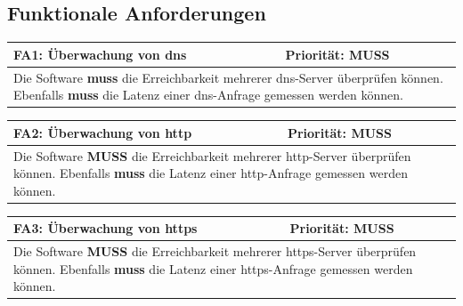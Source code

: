 \documentclass[titlepage]{report}
\begin{document}
\subsection*{Funktionale Anforderungen}
\begin{center}
\begin{tabular}{p{}>{\raggedleft\arraybackslash}p{}}\toprule
    \textbf{FA1: Überwachung von \gls{dns} } & \textbf{Priorität: MUSS} \\\midrule
	\multicolumn{2}{p{\textwidth-\tabcolsep}}{%
        Die Software \textbf{muss} die Erreichbarkeit mehrerer
        \gls{dns}\hyp{}Server überprüfen können. Ebenfalls \textbf{muss} die
        Latenz einer \gls{dns}\hyp{}Anfrage gemessen werden können.}\\\bottomrule
\end{tabular}
    \label{table:FA1}
\end{center}
\begin{center}
\begin{tabular}{p{}>{\raggedleft\arraybackslash}p{}}\toprule
    \textbf{FA2: Überwachung von \gls{http} } & \textbf{Priorität: MUSS} \\\midrule
	\multicolumn{2}{p{\textwidth-\tabcolsep}}{%
        Die Software \textbf{MUSS} die Erreichbarkeit mehrerer
        \gls{http}\hyp{}Server überprüfen können. Ebenfalls
        \textbf{muss} die Latenz einer \gls{http}\hyp{}Anfrage gemessen werden können.}\\\bottomrule
\end{tabular}
    \label{table:FA2}
\end{center}
\begin{center}
\begin{tabular}{p{}>{\raggedleft\arraybackslash}p{}}\toprule
    \textbf{FA3: Überwachung von \gls{https} } & \textbf{Priorität: MUSS} \\\midrule
	\multicolumn{2}{p{\textwidth-\tabcolsep}}{%
        Die Software \textbf{MUSS} die Erreichbarkeit mehrerer
        \gls{https}\hyp{}Server überprüfen können. Ebenfalls \textbf{muss} die
        Latenz einer \gls{https}\hyp{}Anfrage gemessen werden können.}\\\bottomrule
\end{tabular}
    \label{table:FA3}
\end{center}
\end{document}

